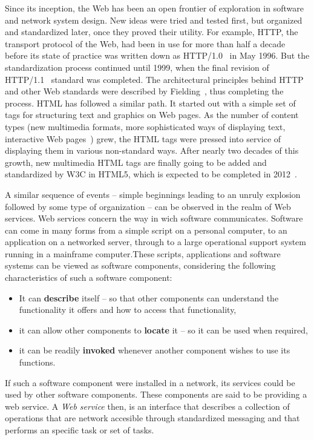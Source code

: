 Since its inception, the Web has been an open frontier of exploration in software and network system design. New ideas were tried and tested first, but organized and standardized later, once they proved their utility. For example, HTTP, the transport protocol of the Web, had been in use for more than half a decade before its state of practice was written down as HTTP/1.0~\cite{rfc1945} in May 1996. But the standardization process continued until 1999, when the final revision of HTTP/1.1~\cite{Fielding:1999} standard was completed. The architectural principles behind HTTP and other Web standards were described by Fielding~\cite{Fielding00Phd}, thus completing the process. HTML has followed a similar path. It started out with a simple set of tags for structuring text and graphics on Web pages. As the number of content types (new multimedia formats, more sophisticated ways of displaying text, interactive Web pages~\cite{Gar05}) grew, the HTML tags were pressed into service of displaying them in various non-standard ways. After nearly two decades of this growth, new multimedia HTML tags are finally going to be added and standardized by W3C in HTML5, which is expected to be completed in 2012~\cite{Hickson2010}.

A similar sequence of events -- simple beginnings leading to an unruly explosion followed by some type of organization -- can be observed in the realm of Web services. Web services concern the way in wich software communicates. Software can come in many forms from a simple script on a personal computer, to an application on a networked server, through to a large operational support system running in a mainframe computer.These scripts, applications and software systems can be viewed as software components, considering the following characteristics of such a software component:

\begin{itemize}
\item It can \textbf{describe} itself -- so that other components can understand the functionality it offers and how to access that functionality,
\item it can allow other components to \textbf{locate} it -- so it can be used when required,
\item it can be readily \textbf{invoked} whenever another component wishes to use its functions.
\end{itemize}

If such a software component were installed in a network, its services could be used by other software components. These components are said to be providing a web service. A \textit{Web service} then, is an interface that describes a collection of operations that are network accesible through standardized messaging and that performs an specific task or set of tasks\cite{Gottschalk:2002,Muschamp:2004}.

